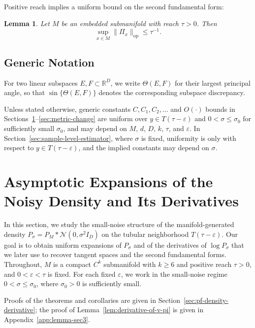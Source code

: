 \documentclass[11pt]{article}
\theoremstyle{plain}
\newtheorem{lemma}[theorem]{Lemma}
\theoremstyle{definition}
\begin{document}
Positive reach implies a uniform bound on the second fundamental form:
\begin{lemma}\label{lem:second-fundamental-form-bound} \citep[Proposition~6.1]{Niyogi2008FindingTH}
Let $M$ be an embedded submanifold with reach $\tau > 0$. Then
\[
  \sup_{x\in M}\|\Pi_x\|_{\mathrm{op}} \le \tau^{-1}.
\]
\end{lemma}

\subsection{Generic Notation}
For two linear subspaces $E,F\subset \mathbb R^D$, we write $\Theta(E,F)$ for their largest principal angle, so that $\sin\{\Theta(E,F)\}$ denotes the corresponding subspace discrepancy.

Unless stated otherwise, generic constants $C, C_1, C_2, \dots$ and $O(\cdot)$ bounds in Sections~\ref{sec:density-and-derivatives}--\ref{sec:metric-change} are uniform over $y\in T(\tau-\varepsilon)$ and $0<\sigma\le \sigma_0$ for sufficiently small $\sigma_0$, and may depend on $M$, $d$, $D$, $k$, $\tau$, and $\varepsilon$. In Section~\ref{sec:sample-level-estimator}, where $\sigma$ is fixed, uniformity is only with respect to $y\in T(\tau-\varepsilon)$, and the implied constants may depend on $\sigma$.

\section{Asymptotic Expansions of the Noisy Density and Its Derivatives}\label{sec:density-and-derivatives}
In this section, we study the small-noise structure of the manifold-generated density $P_\sigma = P_M* \mathcal N(0,\sigma^2 I_D)$ on the tubular neighborhood $T(\tau-\varepsilon)$.
Our goal is to obtain uniform expansions of $P_\sigma$ and of the derivatives of $\log P_\sigma$ that we later use to recover tangent spaces and the second
fundamental forms. Throughout, $M$ is a compact $C^k$ submanifold with $k\ge 6$ and positive reach $\tau>0$, and $0<\varepsilon<\tau$ is fixed. For each fixed $\varepsilon$, we work in the small-noise regime $0<\sigma\le\sigma_0$, where $\sigma_0>0$ is sufficiently small.

Proofs of the theorems and corollaries are given in Section~\ref{sec:pf-density-derivative}; the proof of Lemma~\ref{lem:derivative-of-v-pi} is given in Appendix~\ref{app:lemma-sec3}.
\end{document}
